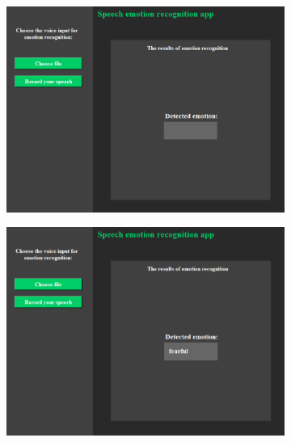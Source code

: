 \documentclass[12pt,titlepage]{article}
\begin{document}
\begin{figure}[ht]
    \centering
    \begin{subfigure}[b]{0.3\textwidth}
        \centering
        \includegraphics[width=\textwidth]{img/1.png}
        \label{fig:sub1}
    \end{subfigure}
    \hfill
    \begin{subfigure}[b]{0.3\textwidth}
        \centering
        \includegraphics[width=\textwidth]{img/2.png}
        \label{fig:sub2}
    \end{subfigure}
    \hfill
    \begin{subfigure}[b]{0.3\textwidth}
        \centering

\end{subfigure}
\end{figure}
\end{document}
